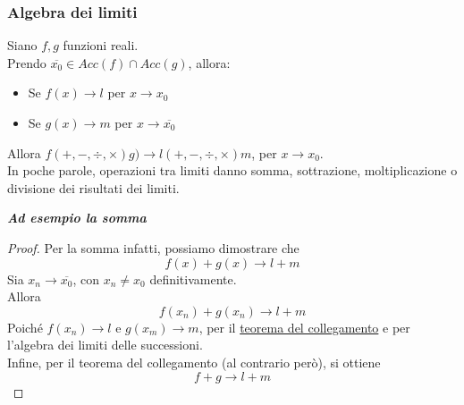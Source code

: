 \documentclass{article}
\theoremstyle{definition}
\begin{document}
\subsubsection{Algebra dei limiti}
Siano $f,g$ funzioni reali.
\\
Prendo $\overline{x_0} \in Acc(f) \cap Acc(g)$, allora:
\begin{itemize}
    \item Se $f(x) \to l$ per $x \to x_0$
    \item Se $g(x) \to m$ per $x \to \overline{x_0}$
\end{itemize}
Allora $f (+,-,\div,\times) g) \to l (+,-,\div,\times) m$, per $x \to x_0$.\\
In poche parole, operazioni tra limiti danno somma, sottrazione, moltiplicazione o divisione dei risultati dei limiti.\\
\begin{center}
    \textbf{\textit{Ad esempio la somma}}
\end{center}
\begin{proof}
Per la somma infatti, possiamo dimostrare che
\begin{equation}
    f(x)+g(x) \to l+m
\end{equation}
Sia $x_n \to \overline{x_0}$, con $x_n \neq x_0$ definitivamente.
\\
Allora
\begin{equation}
    f(x_n)+g(x_n) \to l+m
\end{equation}
Poiché $f(x_n) \to l$ e $g(x_m) \to m$, per il \underline{teorema del collegamento} e per l'algebra dei limiti delle successioni.
\\
Infine, per il teorema del collegamento (al contrario però), si ottiene 
\begin{equation}
    f+g \to l+m
\end{equation}
\end{proof}
\end{document}
